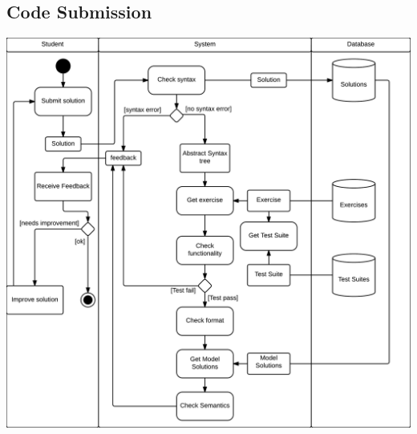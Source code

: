 \subsection{Code Submission}
\includegraphics[scale=0.8]{diagrams-images/code-submission-activity-diagram}

